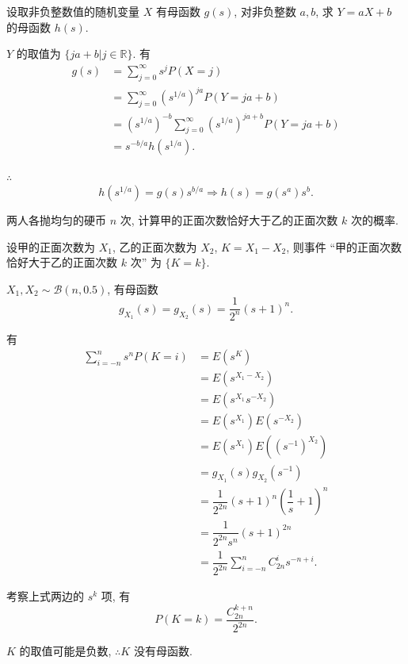 \documentclass[color=black,device=normal,lang=cn]{elegantnote}
\numberwithin{equation}{section}
\theoremstyle{plain}
\numberwithin{exercise}{exsection}
\begin{document}
\begin{exercise}%
    设取非负整数值的随机变量 $X$ 有母函数 $g(s)$, 对非负整数 $a,b$, 求 $Y=aX+b$ 的母函数 $h(s)$.
\end{exercise}
\begin{solution}
    $Y$ 的取值为 $\{ja+b|j\in\mathbb{R}\}$. 有
    \begin{align*}
        g(s) & =\sum\limits_{j=0}^\infty s^jP(X=j) \\
        & =\sum\limits_{j=0}^\infty(s^{1/a})^{ja}P(Y=ja+b) \\
        & =(s^{1/a})^{-b}\sum\limits_{j=0}^\infty(s^{1/a})^{ja+b}P(Y=ja+b) \\
        & =s^{-b/a}h(s^{1/a}).
    \end{align*}

    $\therefore$
    \[h(s^{1/a})=g(s)s^{b/a}\Rightarrow h(s)=g(s^a)s^b.\]
\end{solution}
\addtocounter{exercise}{2}
\begin{exercise}%
    两人各抛均匀的硬币 $n$ 次, 计算甲的正面次数恰好大于乙的正面次数 $k$ 次的概率.
\end{exercise}
\begin{solution}
    设甲的正面次数为 $X_1$, 乙的正面次数为 $X_2$, $K=X_1-X_2$, 则事件 ``甲的正面次数恰好大于乙的正面次数 $k$ 次'' 为 $\{K=k\}$.

    $X_1,X_2\sim\mathcal{B}(n,0.5)$, 有母函数
    \[g_{X_1}(s)=g_{X_2}(s)=\dfrac{1}{2^n}(s+1)^n.\]

    有
    \begin{align*}
        \sum\limits_{i=-n}^ns^nP(K=i) & =E(s^K) \\
        & =E(s^{X_1-X_2}) \\
        & =E(s^{X_1}s^{-X_2}) \\
        & =E(s^{X_1})E(s^{-X_2}) \\
        & =E(s^{X_1})E((s^{-1})^{X_2}) \\
        & =g_{X_1}(s)g_{X_2}(s^{-1}) \\
        & =\dfrac{1}{2^{2n}}(s+1)^n\left(\dfrac{1}{s}+1\right)^n \\
        & =\dfrac{1}{2^{2n}s^n}(s+1)^{2n} \\
        & =\dfrac{1}{2^{2n}}\sum\limits_{i=-n}^nC_{2n}^is^{-n+i}.
    \end{align*}

    考察上式两边的 $s^k$ 项, 有
    \[P(K=k)=\dfrac{C_{2n}^{k+n}}{2^{2n}}.\]
\end{solution}
\begin{remark}
    $K$ 的取值可能是负数, $\therefore K$ 没有母函数.
\end{remark}
\addtocounter{exercise}{4}
\end{document}
